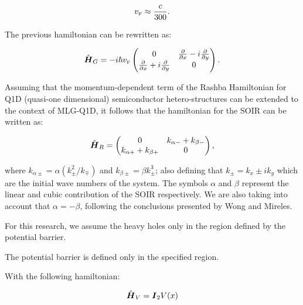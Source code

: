     \begin{equation}
        \label{eq:vF}
        v_{\mbox{\tiny F}} \approx \frac{c}{300}.
    \end{equation}

    The previous hamiltonian can be rewritten as:

\begin{equation}
    \label{eq:pristineGrapheneMatrix}
    \hat{\mbox{\boldmath $H$}}_G = -i\hbar v_{\mbox{\tiny F}}
    \begin{pmatrix}
        0 & \frac{\partial}{\partial x}- i\frac{\partial}{\partial y}\\
        \frac{\partial}{\partial x}+ i\frac{\partial}{\partial y} & 0
    \end{pmatrix}.
\end{equation}

    Assuming that the momentum-dependent term of the Rashba Hamiltonian for Q1D (quasi-one dimensional) semiconductor hetero-structures can be extended to the context of MLG-Q1D\cite{RDiago2010, JAP2019}, it follows that the hamiltonian for the SOIR can be written as:

    \begin{equation}
        \label{eq:SOIRHamiltonian}
        \hat{\mbox{\boldmath $H$}}_R =
        \begin{pmatrix}
            0 & k_{\alpha-} + k_{\beta-}\\
            k_{\alpha+} + k_{\beta+} & 0
        \end{pmatrix},
    \end{equation}

    \noindent where $k_{\alpha\pm} = \alpha\left(k_{\pm}^2/k_{\mp}\right)$ and $k_{\beta\pm} = \beta k_{\pm}^3$; also defining that $k_{\pm}=k_x\pm i k_y$ which are the initial wave numbers of the system.
    The symbols $\alpha$ and $\beta$ represent the linear and cubic contribution of the SOIR respectively.
    We are also taking into account that $\alpha = -\beta$, following the conclusions presented by Wong and Mireles\cite{WongUNAM2005}.

    For this research, we assume the heavy holes only in the region defined by the potential barrier.

    The potential barrier is defined only in the specified region.


    With the following hamiltonian:

    \begin{equation}
        \label{eq:potentialBarrierHamiltonian}
        \hat{\mbox{\boldmath $H$}}_V=\mbox{\boldmath $I$}_2 V(x)
    \end{equation}

